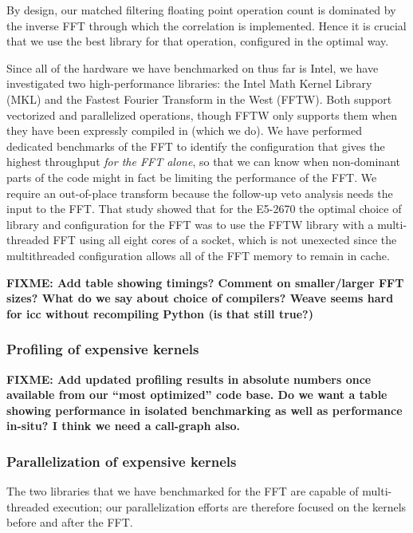 \documentclass{article}
\begin{document}
By design, our matched filtering floating point operation count is dominated by
the inverse FFT through which the correlation is implemented. Hence it is
crucial that we use the best library for that operation, configured in the
optimal way.

Since all of the hardware we have benchmarked on thus far is Intel, we have
investigated two high-performance libraries: the Intel Math Kernel Library (MKL)
and the Fastest Fourier Transform in the West (FFTW). Both support vectorized
and parallelized operations, though FFTW only supports them when they have been
expressly compiled in (which we do).  We have performed dedicated benchmarks of
the FFT to identify the configuration that gives the highest throughput
\emph{for the FFT alone}, so that we can know when non-dominant parts of the
code might in fact be limiting the performance of the FFT.  We require an
out-of-place transform because the follow-up veto analysis needs the input to
the FFT.  That study showed that for the E5-2670 the optimal choice of library
and configuration for the FFT was to use the FFTW library with a multi-threaded
FFT using all eight cores of a socket, which is not unexected since the
multithreaded configuration allows all of the FFT memory to remain in cache.

\textbf{FIXME: Add table showing timings?  Comment on smaller/larger FFT sizes?
  What do we say about choice of compilers?  Weave seems hard for icc without
  recompiling Python (is that still true?)}

\subsubsection{Profiling of expensive kernels}
\label{sec:prof-expens-kern}

\textbf{FIXME: Add updated profiling results in absolute numbers once available
  from our ``most optimized'' code base.  Do we want a table showing performance
  in isolated benchmarking as well as performance in-situ? I think we need a
  call-graph also.}

\subsubsection{Parallelization of expensive kernels}
\label{sec:parall-expens-kern}

The two libraries that we have benchmarked for the FFT are capable of
multi-threaded execution; our parallelization efforts are therefore focused on
the kernels before and after the FFT.
\end{document}
